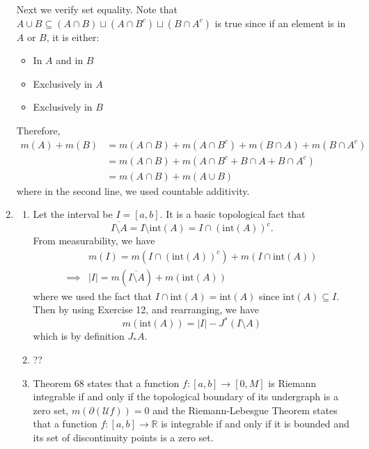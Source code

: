\documentclass{article}
\begin{document}
\begin{enumerate}
    Next we verify set equality. Note that $A\cup B \subseteq (A\cap B)\sqcup (A\cap B^c) \sqcup (B\cap A^c)$ is true since if an element is in $A$ or $B$, it is either:
    \begin{itemize}
        \item In $A$ and in $B$
        \item Exclusively in $A$
        \item Exclusively in $B$
    \end{itemize}
    Therefore,
    \begin{align}
        m(A) + m(B) &= m(A \cap B) + m(A \cap B^c) + m(B \cap A) + m(B \cap A^c) \\ 
        &= m(A\cap B) + m(A \cap B^c + B\cap A + B\cap A^c) \\ 
        &= m(A\cap B) + m(A\cup B)
    \end{align}
    where in the second line, we used countable additivity.\newpage
    \item \begin{enumerate}[label=(\alph*)]
        \item Let the interval be $I=[a,b].$ It is a basic topological fact that
        \begin{equation}
            \overline{I\setminus A} = I \setminus \text{int}(A) = I \cap (\text{int}(A))^c.
        \end{equation}
        From measurability, we have 
        \begin{align}
            &m(I) = m(I \cap (\text{int}(A))^c) + m(I \cap \text{int}(A)) \\ 
            \implies & |I| = m(\overline{I\setminus A}) + m(\text{int}(A))
        \end{align}
        where we used the fact that $I\cap \text{int}(A) = \text{int}(A)$ since $\text{int}(A) \subseteq I.$ Then by using Exercise 12, and rearranging, we have 
        \begin{equation}
            m(\text{int}(A)) =  |I| - J^*(I\setminus A)
        \end{equation}
        which is by definition $J_*A.$
        \item ??
        \item Theorem 68 states that a function $f:[a,b]\to [0,M]$ is Riemann integrable if and only if the topological boundary of its undergraph is a zero set, $m(\partial(\mathcal{U}f))=0$ and the Riemann-Lebesgue Theorem states that a function $f:[a,b]\to \mathbb{R}$ is integrable if and only if it is bounded and its set of discontinuity points is a zero set.
        

\end{enumerate}
\end{enumerate}
\end{document}
